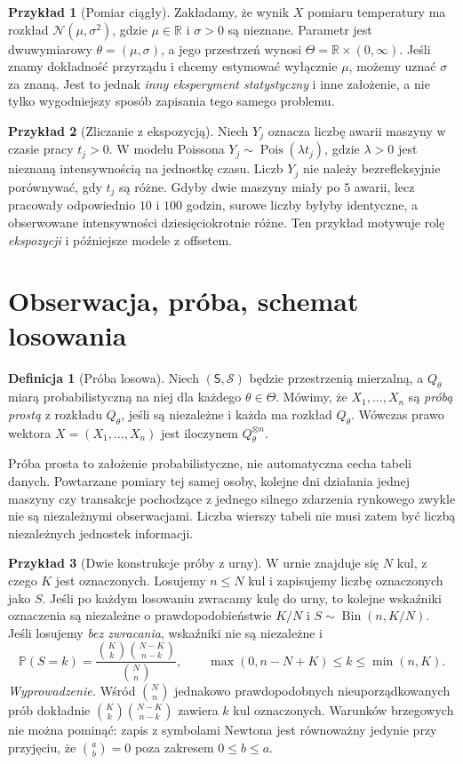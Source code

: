 \documentclass[11pt,a4paper,oneside]{report}
\numberwithin{equation}{chapter}
\theoremstyle{plain}
\theoremstyle{definition}
\newtheorem{definicja}{Definicja}[chapter]
\newtheorem{przyklad}{Przykład}[chapter]
\theoremstyle{remark}
\newcommand{\R}{\mathbb R}
\newcommand{\Prob}{\mathbb P}
\newcommand{\Normal}{\mathcal N}
\DeclareMathOperator{\Bin}{Bin}
\DeclareMathOperator{\Pois}{Pois}
\begin{document}
\begin{przyklad}[Pomiar ciągły]
Zakładamy, że wynik $X$ pomiaru temperatury ma rozkład $\Normal(\mu,\sigma^2)$, gdzie $\mu\in\R$ i $\sigma>0$ są nieznane. Parametr jest dwuwymiarowy $\theta=(\mu,\sigma)$, a jego przestrzeń wynosi $\Theta=\R\times(0,\infty)$. Jeśli znamy dokładność przyrządu i chcemy estymować wyłącznie $\mu$, możemy uznać $\sigma$ za znaną. Jest to jednak \emph{inny eksperyment statystyczny} i inne założenie, a nie tylko wygodniejszy sposób zapisania tego samego problemu.
\end{przyklad}

\begin{przyklad}[Zliczanie z ekspozycją]\label{ex:exposure}
Niech $Y_j$ oznacza liczbę awarii maszyny w czasie pracy $t_j>0$. W modelu Poissona $Y_j\sim\Pois(\lambda t_j)$, gdzie $\lambda>0$ jest nieznaną intensywnością na jednostkę czasu. Liczb $Y_j$ nie należy bezrefleksyjnie porównywać, gdy $t_j$ są różne. Gdyby dwie maszyny miały po $5$ awarii, lecz pracowały odpowiednio $10$ i $100$ godzin, surowe liczby byłyby identyczne, a obserwowane intensywności dziesięciokrotnie różne. Ten przykład motywuje rolę \emph{ekspozycji} i późniejsze modele z offsetem.
\end{przyklad}

\section{Obserwacja, próba, schemat losowania}
\begin{definicja}[Próba losowa]\label{def:sample}
Niech $(\mathsf S,\mathcal S)$ będzie przestrzenią mierzalną, a $Q_\theta$ miarą probabilistyczną na niej dla każdego $\theta\in\Theta$. Mówimy, że $X_1,\ldots,X_n$ są \emph{próbą prostą} z rozkładu $Q_\theta$, jeśli są niezależne i każda ma rozkład $Q_\theta$. Wówczas prawo wektora $X=(X_1,\ldots,X_n)$ jest iloczynem $Q_\theta^{\otimes n}$.
\end{definicja}

Próba prosta to założenie probabilistyczne, nie automatyczna cecha tabeli danych. Powtarzane pomiary tej samej osoby, kolejne dni działania jednej maszyny czy transakcje pochodzące z jednego silnego zdarzenia rynkowego zwykle nie są niezależnymi obserwacjami. Liczba wierszy tabeli nie musi zatem być liczbą niezależnych jednostek informacji.

\begin{przyklad}[Dwie konstrukcje próby z urny]\label{ex:replacement}
W urnie znajduje się $N$ kul, z czego $K$ jest oznaczonych. Losujemy $n\le N$ kul i zapisujemy liczbę oznaczonych jako $S$. Jeśli po każdym losowaniu zwracamy kulę do urny, to kolejne wskaźniki oznaczenia są niezależne o prawdopodobieństwie $K/N$ i $S\sim\Bin(n,K/N)$. Jeśli losujemy \emph{bez zwracania}, wskaźniki nie są niezależne i
\[
\Prob(S=k)=\frac{\binom Kk\binom{N-K}{n-k}}{\binom Nn},\qquad
\max(0,n-N+K)\le k\le\min(n,K).
\]
\emph{Wyprowadzenie.} Wśród $\binom Nn$ jednakowo prawdopodobnych nieuporządkowanych prób dokładnie $\binom Kk\binom{N-K}{n-k}$ zawiera $k$ kul oznaczonych. Warunków brzegowych nie można pominąć: zapis z symbolami Newtona jest równoważny jedynie przy przyjęciu, że $\binom ab=0$ poza zakresem $0\le b\le a$.
\end{przyklad}
\end{document}
